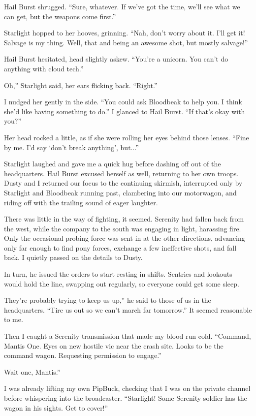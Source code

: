 Hail Burst shrugged. “Sure, whatever. If we’ve got the time, we’ll see what we can get, but the weapons come first.”

Starlight hopped to her hooves, grinning. “Nah, don’t worry about it. I’ll get it! Salvage is my thing. Well, that and being an awesome shot, but mostly salvage!”

Hail Burst hesitated, head slightly askew. “You’re a unicorn. You can’t do anything with cloud tech.”

\leavevmode{}Oh,” Starlight said, her ears flicking back. “Right.”

I nudged her gently in the side. “You could ask Bloodbeak to help you. I think she’d like having something to do.” I glanced to Hail Burst. “If that’s okay with you?”

Her head rocked a little, as if she were rolling her eyes behind those lenses. “Fine by me. I’d say ‘don’t break anything’, but...”

Starlight laughed and gave me a quick hug before dashing off out of the headquarters. Hail Burst excused herself as well, returning to her own troops. Dusty and I returned our focus to the continuing skirmish, interrupted only by Starlight and Bloodbeak running past, clambering into our motorwagon, and riding off with the trailing sound of eager laughter.

There was little in the way of fighting, it seemed. Serenity had fallen back from the west, while the company to the south was engaging in light, harassing fire. Only the occasional probing force was sent in at the other directions, advancing only far enough to find pony forces, exchange a few ineffective shots, and fall back. I quietly passed on the details to Dusty.

In turn, he issued the orders to start resting in shifts. Sentries and lookouts would hold the line, swapping out regularly, so everyone could get some sleep.

\leavevmode{}They’re probably trying to keep us up,” he said to those of us in the headquarters. “Tire us out so we can’t march far tomorrow.” It seemed reasonable to me.

Then I caught a Serenity transmission that made my blood run cold. “Command, Mantis One. Eyes on new hostile vic near the crash site. Looks to be the command wagon. Requesting permission to engage.”

\leavevmode{}Wait one, Mantis.”

I was already lifting my own PipBuck, checking that I was on the private channel before whispering into the broadcaster. “Starlight! Some Serenity soldier has the wagon in his sights. Get to cover!”

